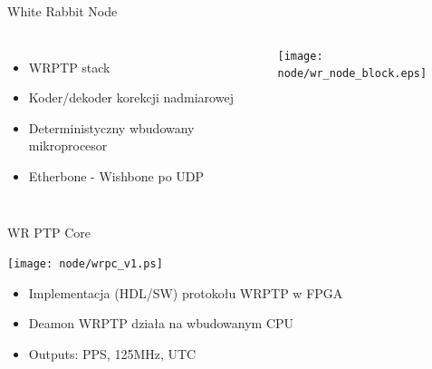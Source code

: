 \documentclass[compress,red]{beamer}
\begin{document}
\begin{frame}{White Rabbit Node}

  \begin{columns}[c]

  \begin{itemize}
    \item WRPTP stack
    \item Koder/dekoder korekcji nadmiarowej
    \item Deterministyczny wbudowany mikroprocesor
    \item Etherbone - Wishbone po UDP
  \end{itemize}



    \begin{center}
    \texttt{[image: node/wr\_node\_block.eps]}
    \end{center}


  \end{columns}



\end{frame}
\begin{frame}{WR PTP Core}





    \begin{center}
    \texttt{[image: node/wrpc\_v1.ps]}
    \end{center}

  \begin{itemize}
    \item Implementacja (HDL/SW) protokołu WRPTP w FPGA
    \item Deamon WRPTP działa na wbudowanym CPU
    \item Outputs: PPS, 125MHz, UTC
  \end{itemize}






\end{frame}
\end{document}
